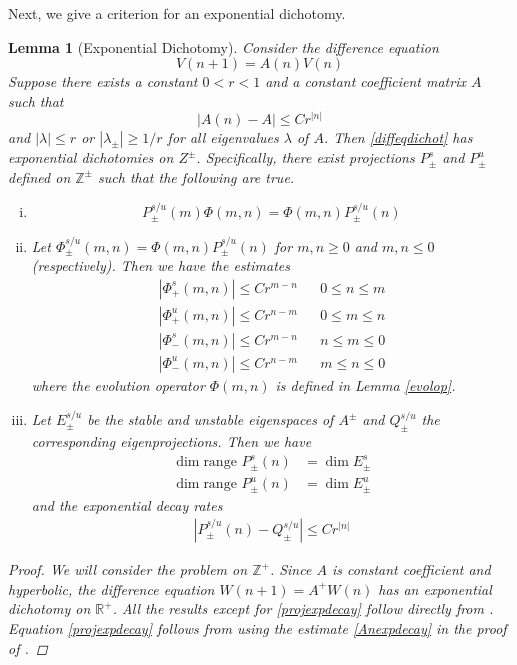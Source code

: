 \documentclass[12pt]{article}
\def\R{{\mathbb R}}
\def\Z{{\mathbb Z}}
\newtheorem{lemma}{Lemma}
\begin{document}
Next, we give a criterion for an exponential dichotomy.

\begin{lemma}[Exponential Dichotomy]\label{dichotomy}
Consider the difference equation
\begin{equation}\label{diffeqdichot}
V(n+1) = A(n) V(n)
\end{equation}
Suppose there exists a constant $0 < r < 1$ and a constant coefficient matrix $A$ such that 
\begin{equation}\label{Anexpdecay}
|A(n) - A| \leq C r^{|n|}
\end{equation}
and $|\lambda| \leq r$ or $|\lambda_\pm| \geq 1/r$ for all eigenvalues $\lambda$ of $A$. Then \eqref{diffeqdichot} has exponential dichotomies on $Z^\pm$. Specifically, there exist projections $P_\pm^s$ and $P_\pm^u$ defined on $\Z^\pm$ such that the following are true.
\begin{enumerate}[(i)]
\item
\begin{equation}\label{projcommute}
P_\pm^{s/u}(m) \Phi(m, n) =  \Phi(m, n) P_\pm^{s/u}(n)
\end{equation}

\item Let $\Phi_\pm^{s/u}(m, n) = \Phi(m, n) P_\pm^{s/u}(n)$ for $m, n \geq 0$ and $m, n \leq 0$ (respectively). Then we have the estimates
\begin{align*}
|\Phi_+^s(m, n)| \leq C r^{m - n} && 0 \leq n \leq m \\
|\Phi_+^u(m, n)| \leq C r^{n - m} && 0 \leq m \leq n \\
|\Phi_-^s(m, n)| \leq C r^{m - n} && n \leq m \leq 0 \\
|\Phi_-^u(m, n)| \leq C r^{n - m} && m \leq n \leq 0
\end{align*}
where the evolution operator $\Phi(m, n)$ is defined in Lemma \ref{evolop}. 

\item Let $E_\pm^{s/u}$ be the stable and unstable eigenspaces of $A^\pm$ and $Q_\pm^{s/u}$ the corresponding eigenprojections. Then we have
\begin{align*}
\dim \text{range }P_\pm^s(n) &= \dim E_\pm^s \\
\dim \text{range }P_\pm^u(n) &= \dim E_\pm^u
\end{align*}
and the exponential decay rates
\begin{align}\label{projexpdecay}
| P_\pm^{s/u}(n) - Q_\pm^{s/u} | \leq C r^{|n|}
\end{align}
\end{enumerate}

\begin{proof}
We will consider the problem on $\Z^+$. Since $A$ is constant coefficient and hyperbolic, the difference equation $W(n+1) = A^+ W(n)$ has an exponential dichotomy on $\R^+$. All the results except for \eqref{projexpdecay} follow directly from \cite[Proposition 2.5]{Beyn1997}. Equation \eqref{projexpdecay} follows from using the estimate \eqref{Anexpdecay} in the proof of \cite[Proposition 2.5]{Beyn1997}.
\end{proof}
\end{lemma}
\end{document}
